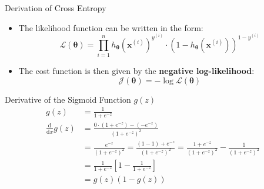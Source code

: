 \begin{frame}{Derivation of Cross Entropy}{}\optional
	\begin{itemize}
		\item The likelihood function can be written in the form:
		\begin{equation}
			\mathcal{L}(\bm{\theta}) = \prod_{i=1}^n h_{\bm{\theta}}(\bm{x}^{(i)})^{y^{(i)}} \cdot (1 - h_{\bm{\theta}}(\bm{x}^{(i)}))^{1 - y^{(i)}}
		\end{equation}
		\item The cost function is then given by the \textbf{negative log-likelihood}:
		\begin{equation}
			\mathcal{J}(\bm{\theta}) = -\log \mathcal{L}(\bm{\theta})
		\end{equation}
	\end{itemize}
\end{frame}


\begin{frame}{Derivative of the Sigmoid Function $g(z)$}{}\optional
	\footnotesize
	\begin{align*}
		g(z) 
			&= 	\frac{1}{1 + e^{-z}} \\[4mm]
		\frac{\text{d}}{\text{d}x} g(z) 
			&= 	\frac{0 \cdot (1 + e^{-z}) - (-e^{-z})}{(1 + e^{-z})^2} \\[2mm]
			&= 	\frac{e^{-z}}{(1 + e^{-z})^2} = \frac{(1 - 1) + e^{-z}}{(1 + e^{-z})^2} =
				\frac{1 + e^{-z}}{(1 + e^{-z})^2} - \frac{1}{(1 + e^{-z})^2} \\[2mm]
			&= 	\frac{1}{1 + e^{-z}} \left[ 1 - \frac{1}{1 + e^{-z}} \right] \\[2mm]
			&=	\boxed{g(z) (1 - g(z))}
	\end{align*}
\end{frame}


